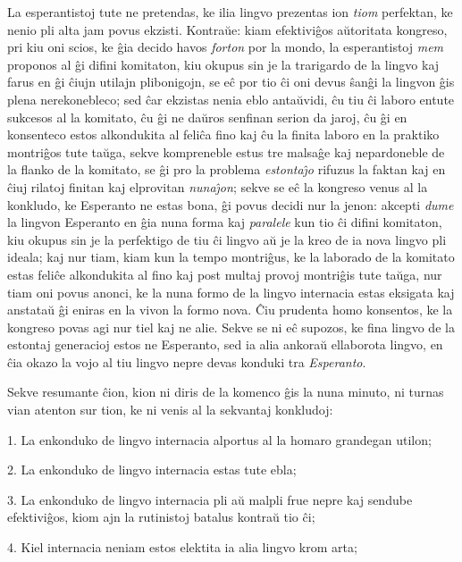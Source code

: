    La esperantistoj tute ne pretendas, ke ilia lingvo prezentas ion
{\sl tiom} perfektan, ke nenio pli alta jam povus ekzisti. Kontra\u
ue: kiam efektivi\^gos a\u utoritata kongreso, pri kiu oni scios, ke
\^gia decido havos {\sl forton} por la mondo, la esperantistoj {\sl
mem} proponos al \^gi difini komitaton, kiu okupus sin je la
trarigardo de la lingvo kaj farus en \^gi \^ciujn utilajn
plibonigojn, se e\^c por tio \^ci oni devus \^san\^gi la lingvon
\^gis plena nerekonebleco; sed \^car ekzistas nenia eblo anta\u
uvidi, \^cu tiu \^ci laboro entute sukcesos al la komitato, \^cu
\^gi ne da\u uros senfinan serion da jaroj, \^cu \^gi en konsenteco
estos alkondukita al feli\^ca fino kaj \^cu la finita laboro en la
praktiko montri\^gos tute ta\u uga, sekve kompreneble estus tre
malsa\^ge kaj nepardoneble de la flanko de la komitato, se \^gi pro
la problema {\sl estonta\^{\j}o} rifuzus la faktan kaj en \^ciuj
rilatoj finitan kaj elprovitan {\sl nuna\^{\j}on}; sekve se e\^c la
kongreso venus al la konkludo, ke Esperanto ne estas bona, \^gi
povus decidi nur la jenon: akcepti {\sl dume} la lingvon Esperanto
en \^gia nuna forma kaj {\sl paralele} kun tio \^ci difini
komitaton, kiu okupus sin je la perfektigo de tiu \^ci lingvo a\u u
je la kreo de ia nova lingvo pli ideala; kaj nur tiam, kiam kun la
tempo montri\^gus, ke la laborado de la komitato estas feli\^ce
alkondukita al fino kaj post multaj provoj montri\^gis tute ta\u
uga, nur tiam oni povus anonci, ke la nuna formo de la lingvo
internacia estas eksigata kaj anstata\u u \^gi eniras en la vivon la
formo nova. \^Ciu prudenta homo konsentos, ke la kongreso povas agi
nur tiel kaj ne alie. Sekve se ni e\^c supozos, ke fina lingvo de la
estontaj generacioj estos ne Esperanto, sed ia alia ankora\u u
ellaborota lingvo, en \^cia okazo la vojo al tiu lingvo nepre devas
konduki tra {\sl Esperanto}.

   Sekve resumante \^cion, kion ni diris de la komenco \^gis la nuna
minuto, ni turnas vian atenton sur tion, ke ni venis al la sekvantaj
konkludoj:

1. La enkonduko de lingvo internacia alportus al la homaro
grandegan utilon;

2. La enkonduko de lingvo internacia estas tute ebla;

3. La enkonduko de lingvo internacia pli a\u u malpli frue nepre kaj
sendube efektivi\^gos, kiom ajn la rutinistoj batalus kontra\u u tio
\^ci;

4. Kiel internacia neniam estos elektita ia alia lingvo krom arta;

